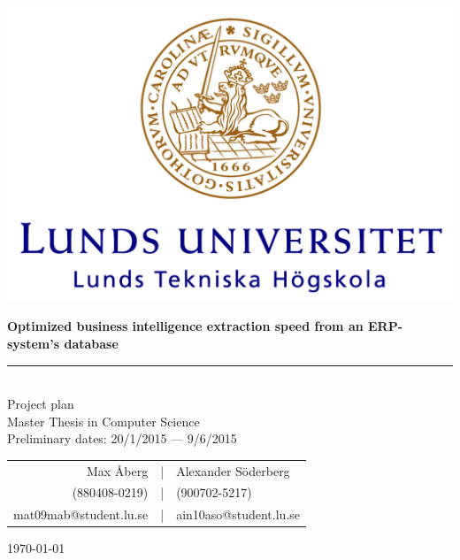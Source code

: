 \documentclass[12pt,a4paper]{article}
\newcommand{\HRule}{\rule{\linewidth}{0.5mm}}
\begin{document}
	\begin{titlepage}
  	\vspace*{3\baselineskip}
    \begin{center}
    	\begin{center}
    \includegraphics[scale=0.5]{Faculty_of_Engineering_(LTH),_Lund_University_logo.png}
    	\end{center}
    \vspace*{3\baselineskip}
    \large
    \bfseries
   \Huge
    Optimized business intelligence extraction speed from an ERP-system's database
   \HRule\\
       \normalfont
          \LARGE
          Project plan \\
            \normalsize
            \vspace*{1\baselineskip}
      Master Thesis in  Computer Science\\
      \vspace*{4\baselineskip}
      Preliminary dates: 20/1/2015 --- 9/6/2015\\
      \vspace*{4\baselineskip}
      
      
      \begin{table}[H]
      \centering
      \begin{tabular}{r c l}
      Max Åberg &|& Alexander Söderberg\\
      (880408-0219) &|& (900702-5217) \\
      mat09mab@student.lu.se &|& ain10aso@student.lu.se\\
      \end{tabular}
      \end{table}

    
    

    \today \\

    \end{center}
\end{titlepage}
    
\end{document}
